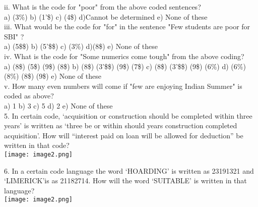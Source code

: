 \documentclass[
]{article}
\begin{document}
ii. What is the code for "poor" from the above coded sentences?\\
a) (3\%) \hspace{1mm} b) (1'\$) \hspace{1mm} c) (4\$) \hspace{1mm} d)Cannot be determined \hspace{1mm} e) None of these\\

iii. What would be the code for "for" in the sentence "Few students are poor for SBI" ?\\
a) (5\$\$) \hspace{1mm} b) (5'\$\$) \hspace{1mm} c) (3\%) \hspace{1mm} d)(8\$) \hspace{1mm} e) None of these\\

iv. What is the code for "Some numerics come tough" from the above coding?\\
a) (8\$) (5\$) (9\$) (8\$) \hspace{1mm} b) (8\$) (3'\$\$) (9\$) (7\$) \hspace{1mm} c) (8\$) (3'\$\$) (9\$) (6\%) \hspace{1mm} d) (6\%) (8\%) (8\$) (9\$) \hspace{1mm} e) None of these\\

v. How many even numbers will come if "few are enjoying Indian Summer" is coded as above?\\
a) 1 \hspace{1mm} b) 3 \hspace{1mm} c) 5 \hspace{1mm} d) 2 \hspace{1mm} e) None of these\\

5. In certain code, ‘acquisition or construction should be completed within three years’ is written as ‘three be or within should years construction completed acquisition’. How will “interest paid on loan will be allowed for deduction” be written in that code?\\
\texttt{[image: image2.png]}


6. In a certain code language the word ‘HOARDING’ is written as 23191321 and ‘LIMERICK’is as 21182714. How will the word ‘SUITABLE’ is written in that language?\\
\texttt{[image: image2.png]}
\end{document}

